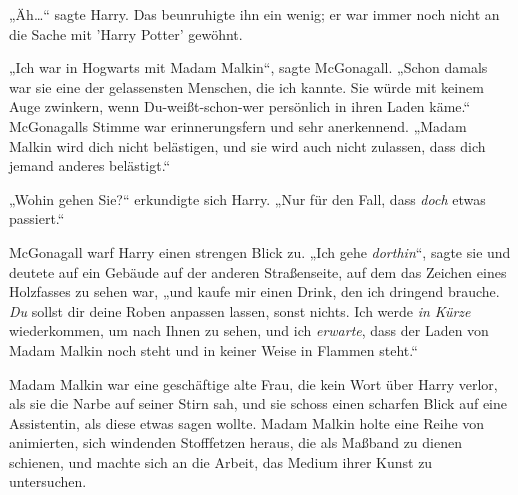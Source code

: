 „Äh…“ sagte Harry. Das beunruhigte ihn ein wenig; er war immer noch nicht an die Sache mit 'Harry Potter' gewöhnt.

„Ich war in Hogwarts mit Madam Malkin“, sagte McGonagall. „Schon damals war sie eine der gelassensten Menschen, die ich kannte. Sie würde mit keinem Auge zwinkern, wenn Du-weißt-schon-wer persönlich in ihren Laden käme.“ McGonagalls Stimme war erinnerungsfern und sehr anerkennend. „Madam Malkin wird dich nicht belästigen, und sie wird auch nicht zulassen, dass dich jemand anderes belästigt.“

„Wohin gehen Sie?“ erkundigte sich Harry. „Nur für den Fall, dass \emph{doch} etwas passiert.“

McGonagall warf Harry einen strengen Blick zu. „Ich gehe \emph{dorthin}“, sagte sie und deutete auf ein Gebäude auf der anderen Straßenseite, auf dem das Zeichen eines Holzfasses zu sehen war, „und kaufe mir einen Drink, den ich dringend brauche. \emph{Du} sollst dir deine Roben anpassen lassen, sonst nichts. Ich werde \emph{in Kürze} wiederkommen, um nach Ihnen zu sehen, und ich \emph{erwarte}, dass der Laden von Madam Malkin noch steht und in keiner Weise in Flammen steht.“

Madam Malkin war eine geschäftige alte Frau, die kein Wort über Harry verlor, als sie die Narbe auf seiner Stirn sah, und sie schoss einen scharfen Blick auf eine Assistentin, als diese etwas sagen wollte. Madam Malkin holte eine Reihe von animierten, sich windenden Stofffetzen heraus, die als Maßband zu dienen schienen, und machte sich an die Arbeit, das Medium ihrer Kunst zu untersuchen.

